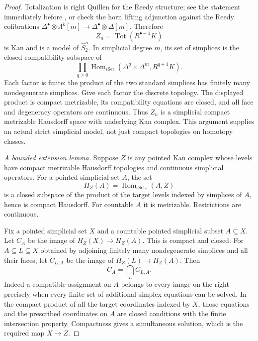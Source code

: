 \begin{proof}
Totalization is right Quillen for the Reedy structure; see the statement immediately before \cite[Proposition 8.1, p.~1034]{FGHBousfield2003}, or check the horn lifting adjunction against the Reedy cofibrations $\Delta^\bullet\otimes\Lambda^k[m]\to\Delta^\bullet\otimes\Delta[m]$. Therefore
\[
 Z_n=\operatorname{Tot}(R^{\bullet+1}K)
\]
is Kan and is a model of $\widehat S^n_2$. In simplicial degree $m$, its set of simplices is the closed compatibility subspace of
\[
 \prod_{q\geq0}
 \operatorname{Hom}_{\mathrm{sSet}}
     (\Delta^q\times\Delta^m,R^{q+1}K).
\]
Each factor is finite: the product of the two standard simplices has finitely many nondegenerate simplices. Give each factor the discrete topology. The displayed product is compact metrizable, its compatibility equations are closed, and all face and degeneracy operators are continuous. Thus $Z_n$ is a simplicial compact metrizable Hausdorff space with underlying Kan complex. This argument supplies an actual strict simplicial model, not just compact topologies on homotopy classes.

\emph{A bounded extension lemma.}
Suppose $Z$ is any pointed Kan complex whose levels have compact metrizable Hausdorff topologies and continuous simplicial operators. For a pointed simplicial set $A$, the set
\[
 H_Z(A)=\operatorname{Hom}_{\mathrm{sSet}_*}(A,Z)
\]
is a closed subspace of the product of the target levels indexed by simplices of $A$, hence is compact Hausdorff. For countable $A$ it is metrizable. Restrictions are continuous.

Fix a pointed simplicial set $X$ and a countable pointed simplicial subset $A\subseteq X$. Let $C_A$ be the image of $H_Z(X)\to H_Z(A)$. This is compact and closed. For $A\subseteq L\subseteq X$ obtained by adjoining finitely many nondegenerate simplices and all their faces, let $C_{L,A}$ be the image of $H_Z(L)\to H_Z(A)$. Then
\begin{equation}\label{eq:G-compact-image-intersection}
 C_A=\bigcap_L C_{L,A}.
\end{equation}
Indeed a compatible assignment on $A$ belongs to every image on the right precisely when every finite set of additional simplex equations can be solved. In the compact product of all the target coordinates indexed by $X$, those equations and the prescribed coordinates on $A$ are closed conditions with the finite intersection property. Compactness gives a simultaneous solution, which is the required map $X\to Z$.


\end{proof}

